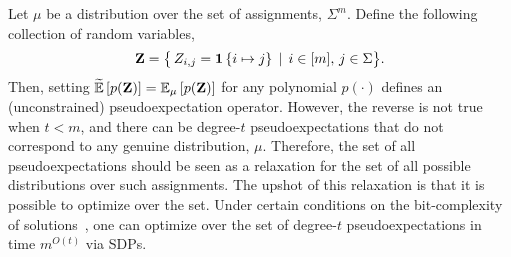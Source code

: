 
%


Let $\mu$ be a distribution over the set of assignments, $\Sigma^m$.  Define the following collection of random variables,  \[\zee = \braces[\big]{ \, Z_{i,j}  = \indi{ i \mapsto j}\, \mid \, i\in[m],\, j\in\Sigma } .\] Then, setting $\tildeEx{p(\zee)} = \Ex{\mu}{p(\zee)} $ for any polynomial $p(\cdot)$ defines an (unconstrained) pseudoexpectation operator. However, the reverse is not true when $t < m$, and there can be degree-$t$ pseudoexpectations that do not correspond to any genuine distribution, $\mu$. Therefore, the set of all pseudoexpectations should be seen as a relaxation for the set of all possible distributions over such assignments. The upshot of this relaxation is that it is possible to optimize over the set. Under certain conditions on the bit-complexity of solutions~\cite{OD16, RW17:sos}, one can optimize over the set of degree-$t$ pseudoexpectations in time $m^{O(t)}$ via SDPs.

%
%

